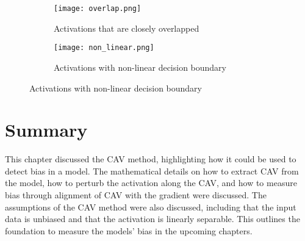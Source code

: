 \begin{figure}[H]
    \centering
    \begin{subfigure}{0.45\textwidth}
        \centering
        \texttt{[image: overlap.png]}
        \caption{Activations that are closely overlapped}
        \label{fig:overlap}
    \end{subfigure}
    \hfill
    \begin{subfigure}{0.45\textwidth}
        \centering
        \texttt{[image: non\_linear.png]}
        \caption{Activations with non-linear decision boundary}
        \label{fig:non_linear}
    \end{subfigure}
\end{figure}

\section{Summary}
This chapter discussed the CAV method, highlighting how it could be used to detect bias in a model. The mathematical details on how to extract CAV from the model, how to perturb the activation along the CAV, and how to measure bias through alignment of CAV with the gradient were discussed. The assumptions of the CAV method were also discussed, including that the input data is unbiased and that the activation is linearly separable. This outlines the foundation to measure the models' bias in the upcoming chapters.